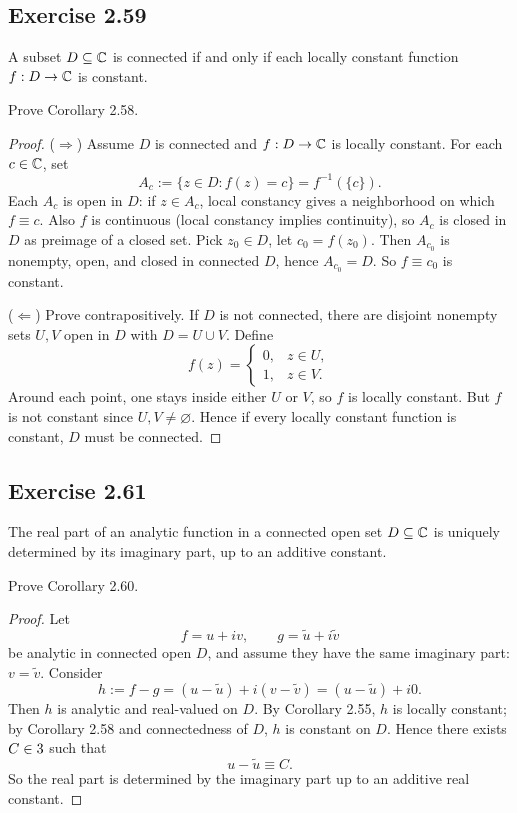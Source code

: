 \documentclass{article}
\begin{document}
\subsection{Exercise 2.59}

\begin{corollary}[Corollary 2.58]
  A subset $D \subseteq \mathbb{C}$ is connected if and only if each locally
  constant function $f : D \to \mathbb{C}$ is constant.
\end{corollary}

Prove Corollary 2.58.

\begin{proof}
  ($\Rightarrow$) Assume $D$ is connected and $f:D\to\mathbb{C}$ is locally
  constant. For each $c\in\mathbb{C}$, set
  \[
    A_c:=\{z\in D: f(z)=c\}=f^{-1}(\{c\}).
  \]
  Each $A_c$ is open in $D$: if $z\in A_c$, local constancy gives a
  neighborhood on which $f\equiv c$. Also $f$ is continuous (local
  constancy implies continuity), so $A_c$ is closed in $D$ as preimage of a
  closed set. Pick $z_0\in D$, let $c_0=f(z_0)$. Then $A_{c_0}$ is nonempty,
  open, and closed in connected $D$, hence $A_{c_0}=D$. So $f\equiv c_0$ is
  constant.

  ($\Leftarrow$) Prove contrapositively. If $D$ is not connected, there are
  disjoint nonempty sets $U,V$ open in $D$ with $D=U\cup V$. Define
  \[
    f(z)=
    \begin{cases}
      0,& z\in U,\\
      1,& z\in V.
    \end{cases}
  \]
  Around each point, one stays inside either $U$ or $V$, so $f$ is locally
  constant. But $f$ is not constant since $U,V\neq\varnothing$.
  Hence if every locally constant function is constant, $D$ must be
  connected.
\end{proof}

\subsection{Exercise 2.61}

\begin{corollary}[Corollary 2.60]
  The real part of an analytic function in a connected open set
  $D \subseteq \mathbb{C}$ is uniquely determined by its imaginary part,
  up to an additive constant.
\end{corollary}

Prove Corollary 2.60.

\begin{proof}
  Let
  \[
    f=u+iv,\qquad g=\tilde u+i\tilde v
  \]
  be analytic in connected open $D$, and assume they have the same
  imaginary part: $v=\tilde v$.
  Consider
  \[
    h:=f-g=(u-\tilde u)+i(v-\tilde v)= (u-\tilde u)+i0.
  \]
  Then $h$ is analytic and real-valued on $D$. By Corollary 2.55, $h$ is
  locally constant; by Corollary 2.58 and connectedness of $D$, $h$ is
  constant on $D$. Hence there exists $C\in3$ such that
  \[
    u-\tilde u\equiv C.
  \]
  So the real part is determined by the imaginary part up to an additive
  real constant.
\end{proof}
\end{document}
